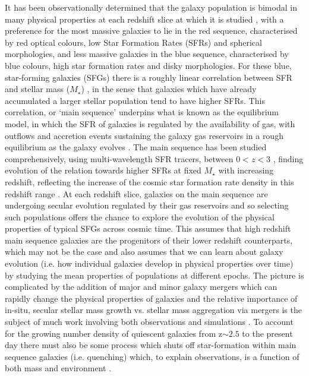 \documentclass[fleqn,usenatbib]{mn2e}
\begin{document}
It has been observationally determined that the galaxy population is bimodal in many physical properties at each redshift slice at which it is studied \citep[e.g. as described in][]{Dekel2006}, with a preference for the most massive galaxies to lie in the red sequence, characterised by red optical colours, low Star Formation Rates (SFRs) and spherical morphologies, and less massive galaxies in the blue sequence, characterised by blue colours, high star formation rates and disky morphologies. 
For these blue, star-forming galaxies (SFGs) there is a roughly linear correlation between SFR and stellar mass ($M_{\star}$) \citep[e.g.][]{Daddi2007,Noeske2007,Elbaz2007}, in the sense that galaxies which have already accumulated a larger stellar population tend to have higher SFRs.
This correlation, or `main sequence' underpins what is known as the equilibrium model, in which the SFR of galaxies is regulated by the availability of gas, with outflows and accretion events sustaining the galaxy gas reservoirs in a rough equilibrium as the galaxy evolves \citep[e.g.][]{Dave2012,Lilly2013,Saintonge2013}.
The main sequence has been studied comprehensively, using multi-wavelength SFR tracers, between $0 < z < 3$ \citep[e.g.][]{Rodighiero2011,Karim2011,Whitaker2012,Behroozi2013b,Whitaker2014,Rodighiero2014,Speagle2014,Pannella2014,Sparre2015,Lee2015,Schreiber2015,Renzini2015,Nelson2016}, finding evolution of the relation towards higher SFRs at fixed $M_{\star}$ with increasing redshift, reflecting the increase of the cosmic star formation rate density in this redshift range \citep{Madau_2014}.
At each redshift slice, galaxies on the main sequence are undergoing secular evolution regulated by their gas reservoirs and so selecting such populations offers the chance to explore the evolution of the physical properties of typical SFGs across cosmic time.
This assumes that high redshift main sequence galaxies are the progenitors of their lower redshift counterparts, which may not be the case \citep[e.g.][]{Gladders2013,Kelson2014,Abramson2016b} and also assumes that we can learn about galaxy evolution (i.e. how individual galaxies develop in physical properties over time) by studying the mean properties of populations at different epochs.
The picture is complicated by the addition of major and minor galaxy mergers which can rapidly change the physical properties of galaxies \citep[e.g.][]{Toomre1977,Lotz2008,Conselice2011,Conselice2014} and the relative importance of in-situ, secular stellar mass growth vs. stellar mass aggregation via mergers is the subject of much work involving both observations and simulations \citep[e.g.][]{Robaina2009,Kaviraj2012,Stott2013,Lofthouse2016,Qu2016}. 
To account for the growing number density of quiescent galaxies from z$\sim 2.5$ to the present day \citep[e.g.][]{Bell2004,Faber2007,Brown2007,Ilbert2010,Brammer2011,Muzzin2013,Buitrago2013} there must also be some process which shuts off star-formation within main sequence galaxies (i.e. quenching) which, to explain observations, is a function of both mass and environment \citep{Peng2010}.
\end{document}
